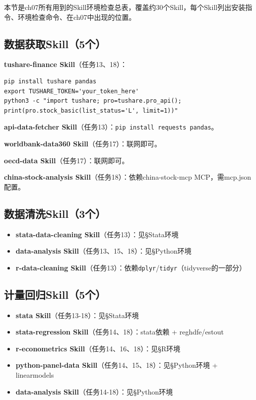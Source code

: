 
本节是ch07所有用到的Skill环境检查总表，覆盖约30个Skill，每个Skill列出安装指令、环境检查命令、在ch07中出现的位置。

\subsection{数据获取Skill（5个）}
\textbf{tushare-finance Skill}（任务13、18）：
\begin{lstlisting}[style=shell]
pip install tushare pandas
export TUSHARE_TOKEN='your_token_here'
python3 -c "import tushare; pro=tushare.pro_api(); print(pro.stock_basic(list_status='L', limit=1))"
\end{lstlisting}
\textbf{api-data-fetcher Skill}（任务13）：\texttt{pip install requests pandas}。

\textbf{worldbank-data360 Skill}（任务17）：联网即可。

\textbf{oecd-data Skill}（任务17）：联网即可。

\textbf{china-stock-analysis Skill}（任务18）：依赖china-stock-mcp MCP，需mcp.json配置。

\subsection{数据清洗Skill（3个）}
\begin{itemize}[leftmargin=1em]
  \item \textbf{stata-data-cleaning Skill}（任务13）：见§Stata环境
  \item \textbf{data-analysis Skill}（任务13、15、18）：见§Python环境
  \item \textbf{r-data-cleaning Skill}（任务13）：依赖\texttt{dplyr}/\texttt{tidyr}（tidyverse的一部分）
\end{itemize}

\subsection{计量回归Skill（5个）}
\begin{itemize}[leftmargin=1em]
  \item \textbf{stata Skill}（任务13-18）：见§Stata环境
  \item \textbf{stata-regression Skill}（任务14、18）：stata依赖 + reghdfe/estout
  \item \textbf{r-econometrics Skill}（任务14、16、18）：见§R环境
  \item \textbf{python-panel-data Skill}（任务14、15、18）：见§Python环境 + linearmodels
  \item \textbf{data-analysis Skill}（任务14-18）：见§Python环境
\end{itemize}

